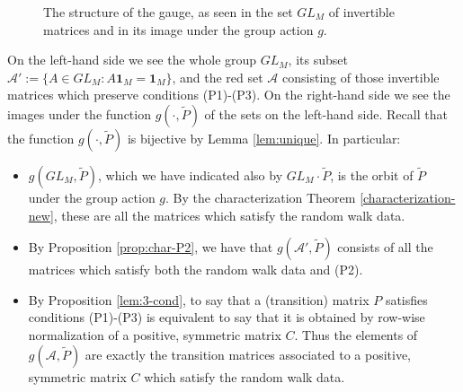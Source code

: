 \documentclass[a4paper,11pt,oneside]{amsart}
\begin{document}
\begin{figure}[!h] 
\centering
{}
\caption{The structure of the gauge, as seen in the set $GL_M$ of invertible matrices and in its image under the group action $g$.}
\label{figure-gauge}
\end{figure}
On the left-hand side we see the whole group $GL_M$, its subset $\mathcal A':=\{A\in GL_M : A\mathbf 1_M = \mathbf 1_M\}$, and the red set $\mathcal A$ consisting of those invertible matrices which preserve conditions (P1)-(P3). On the right-hand side we see the images under the function $g(\cdot,\tilde P)$ of the sets on the left-hand side. Recall that the function $g(\cdot,\tilde P)$ is bijective by Lemma \ref{lem:unique}. In particular:
\begin{itemize}
    \item $g(GL_M,\tilde P)$, which we have indicated also by $GL_M\cdot\tilde P$, is the orbit of $\tilde P$ under the group action $g$. By the characterization Theorem \ref{characterization-new}, these are all the matrices which satisfy the random walk data.
    \item By Proposition \ref{prop:char-P2}, we have that $g(\mathcal A',\tilde P)$ consists of all the matrices which satisfy both the random walk data and (P2).
    \item By Proposition \ref{lem:3-cond}, to say that a (transition) matrix $P$ satisfies conditions (P1)-(P3) is equivalent to say that it is obtained by row-wise normalization of a positive, symmetric matrix $C$. Thus the elements of $g(\mathcal A,\tilde P)$ are exactly the transition matrices associated to a positive, symmetric matrix $C$ which satisfy the random walk data.
\end{itemize}
\end{document}
